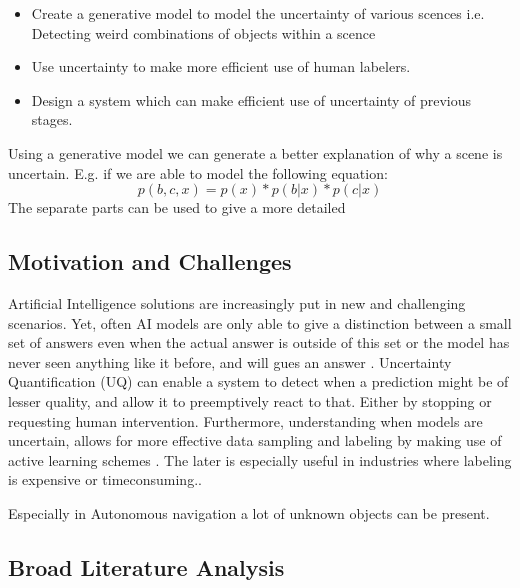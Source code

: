 \begin{itemize}
    \item Create a generative model to model the uncertainty of various scences
          \subitem i.e. Detecting weird combinations of objects within a scence
    \item Use uncertainty to make more efficient use of human labelers.
    \item Design a system which can make efficient use of uncertainty of previous stages.
\end{itemize}

Using a generative model we can generate a better explanation of why a scene is uncertain. E.g. if we are able to model the following equation:
\begin{equation}
    p(b, c, x) = p(x) * p(b | x) * p(c | x)
\end{equation}
The separate parts can be used to give a more detailed

\subsection{Motivation and Challenges}

Artificial Intelligence solutions are increasingly put in new and challenging scenarios. Yet, often AI models are only able to give a distinction between a small set of answers even when the actual answer is outside of this set  or the model has never seen anything like it before, and will gues an answer . Uncertainty Quantification (UQ) can enable a system to detect when a prediction might be of lesser quality, and allow it to preemptively react to that. Either by stopping or requesting human intervention. Furthermore, understanding when models are uncertain, allows for more effective data sampling and labeling by making use of active learning schemes . The later is especially useful in industries where labeling is expensive or timeconsuming..

Especially in Autonomous navigation a lot of unknown objects can be present.

\subsection{Broad Literature Analysis}\label{sec:broadliterature}

